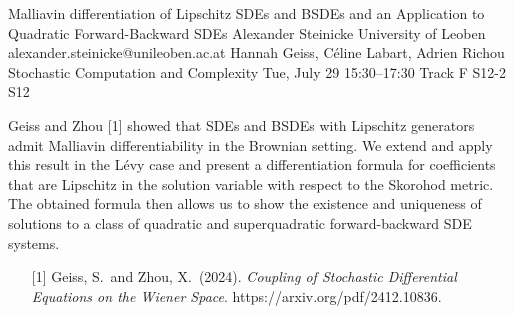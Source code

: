 \begin{talk}
  {Malliavin differentiation of Lipschitz SDEs and BSDEs and an Application to Quadratic Forward-Backward SDEs}%
  {Alexander Steinicke}%
  {University of Leoben}%
  {alexander.steinicke@unileoben.ac.at}%
  {Hannah Geiss, C\'eline Labart, Adrien Richou}%
  {Stochastic Computation and Complexity}%
  {Tue, July 29 15:30–17:30 Track F}%
  {S12-2}%
  {S12}%
				
			
Geiss and Zhou [1] showed that SDEs and BSDEs with Lipschitz generators admit Malliavin differentiability in the Brownian setting. We extend and apply this result in the L\'evy case and present a differentiation formula for coefficients that are Lipschitz in the solution variable with respect to the Skorohod metric. The obtained formula then allows us to show the existence and uniqueness of solutions to a class of quadratic and superquadratic forward-backward SDE systems.

\medskip

\begin{enumerate}
	\item[{[1]}] Geiss, S.~and Zhou, X.~(2024). {\it Coupling of Stochastic Differential Equations on the Wiener Space}. https://arxiv.org/pdf/2412.10836.
\end{enumerate}

\end{talk}

